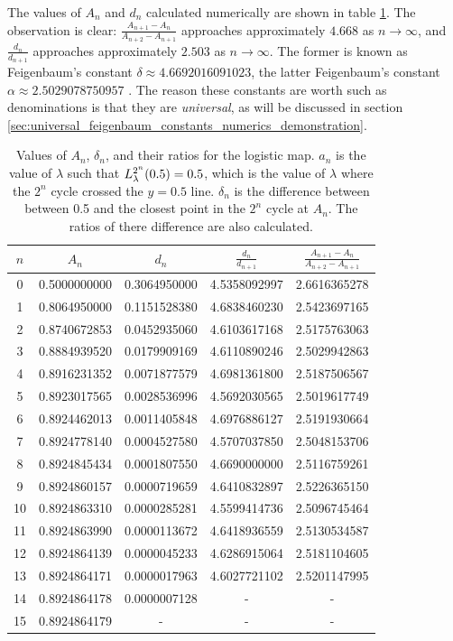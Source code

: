 The values of $A_n$ and $d_n$ calculated numerically are shown in table \ref{tab:feigenbuam_alpha_table_for_logistic}. 
The observation is clear:
$\frac{A_{n+1}-A_n}{A_{n+2}-A_{n+1}}$ approaches approximately $4.668$ as $n \rightarrow \infty$, and $\frac{d_n}{d_{n+1}}$ approaches approximately $2.503$ as $n \rightarrow \infty$. 
The former is known as Feigenbaum's constant $\delta \approx 4.6692016091023$, the latter Feigenbaum's constant $\alpha \approx 2.5029078750957$ \cite{F1}.
The reason these constants are worth such as denominations is that they are \emph{universal}, as will be discussed in section \ref{sec:universal_feigenbaum_constants_numerics_demonstration}.

\begin{table}
\centering
\begin{tabular}{|c|c|c|c|c|}
\hline
\( n \) & \( A_n \) & \( d_n \) &  \(\frac{d_n}{d_{n+1}}\) & \(\frac{A_{n+1} - A_n}{A_{n+2} - A_{n+1}}\)  \\ \hline
0 & 0.5000000000 & 0.3064950000 & 4.5358092997 & 2.6616365278 \\
1 & 0.8064950000 & 0.1151528380 & 4.6838460230 & 2.5423697165 \\
2 & 0.8740672853 & 0.0452935060 & 4.6103617168 & 2.5175763063 \\
3 & 0.8884939520 & 0.0179909169 & 4.6110890246 & 2.5029942863 \\
4 & 0.8916231352 & 0.0071877579 & 4.6981361800 & 2.5187506567 \\
5 & 0.8923017565 & 0.0028536996 & 4.5692030565 & 2.5019617749 \\
6 & 0.8924462013 & 0.0011405848 & 4.6976886127 & 2.5191930664 \\
7 & 0.8924778140 & 0.0004527580 & 4.5707037850 & 2.5048153706 \\
8 & 0.8924845434 & 0.0001807550 & 4.6690000000 & 2.5116759261 \\
9 & 0.8924860157 & 0.0000719659 & 4.6410832897 & 2.5226365150 \\
10 & 0.8924863310 & 0.0000285281 & 4.5599414736 & 2.5096745464 \\
11 & 0.8924863990 & 0.0000113672 & 4.6418936559 & 2.5130534587 \\
12 & 0.8924864139 & 0.0000045233 & 4.6286915064 & 2.5181104605 \\
13 & 0.8924864171 & 0.0000017963 & 4.6027721102 & 2.5201147995 \\
14 & 0.8924864178 & 0.0000007128 &  - &  - \\
15 & 0.8924864179 &  - &  - &  - \\
\hline
\end{tabular}
\caption{
	Values of \( A_n \), \( \delta_n \), and their ratios for the logistic map.
	$a_n$ is the value of $\lambda$ such that $L_{\lambda}^{2^n}(0.5) = 0.5$, which is the value of $\lambda$ where the $2^n$ cycle crossed the $y=0.5$ line. 
	$\delta_n$ is the difference between between 0.5 and the closest point in the $2^n$ cycle at $A_n$.
	The ratios of there difference are also calculated.
}
\label{tab:feigenbuam_alpha_table_for_logistic}
\end{table}

